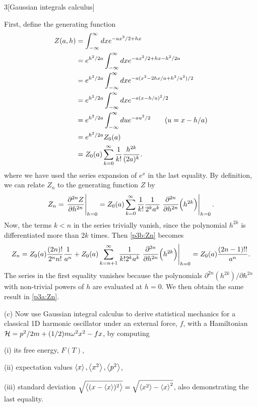 \documentclass[12pt]{article}
\begin{document}
\begin{problem}{3}[Gaussian integrals calculus]
\begin{solution}
First, define the generating function
\begin{align}
    Z(a,h)
    &=\int_{-\infty}^\infty dx e^{-ax^2/2+hx} \notag\\
    &=e^{h^2/2a}\int_{-\infty}^\infty dxe^{-ax^2/2+hx-h^2/2a}\notag\\
    &=e^{h^2/2a}\int_{-\infty}^\infty dxe^{-a(x^2-2hx/a+h^2/a^2)/2}\notag\\
    &=e^{h^2/2a}\int_{-\infty}^\infty dxe^{-a(x-h/a)^2/2}\notag\\
    &=e^{h^2/2a}\int_{-\infty}^\infty due^{-au^2/2}\tag{$u=x-h/a$}\notag\\
    &=e^{h^2/2a}Z_0(a)\notag\\
    &=Z_0(a)\sum_{k=0}^{\infty}\frac1{k!}\frac{h^{2k}}{(2a)^k}.
\end{align}
where we have used the series expansion of $e^{x}$ in the last equality. By
definition, we can relate $Z_n$ to the generating function $Z$ by
\begin{align}\label{p3b:Zn}
    Z_n=\eval{\frac{\partial^{2n} Z}{\partial h^{2n}}}_{h=0}
    =Z_0(a)\sum_{k=0}^\infty
    \frac1{k!}\frac1{2^ka^k}\eval{\frac{\partial^{2n}}{\partial
    h^{2n}}\qty(h^{2k})}_{h=0}.
\end{align}
Now, the terms $k<n$ in the series trivially vanish, since the polynomial
$h^{2k}$ is differentiated more than $2k$ times. Then \eqref{p3b:Zn} becomes
\begin{align}
    Z_n
    =Z_0(a)\frac{(2n)!}{2^nn!}\frac1{a^n}
    +Z_0(a)\sum_{k=n+1}^\infty\frac{1}{k!2^ka^k}\eval{\frac{\partial^{2n}}{\partial
    h^{2n}}\qty(h^{2k})}_{h=0}
    =Z_0(a)\frac{(2n-1)!!}{a^n}.
\end{align}
The series in the first equality vanishes because the polynomials
$\partial^{2n}(h^{2k})/\partial h^{2n}$ with non-trivial powers of $h$ are
evaluated at $h=0$. We then obtain the same result in \eqref{p3a:Zn}.
\end{solution}


(c) Now use Gaussian integral calculus to derive statistical mechanics for a
classical 1D harmonic oscillator under an external force, $f$, with a
Hamiltonian $\mathcal{H}=p^2/2m+(1/2)m\omega^2x^2-fx$, by computing

\qquad(i) its free energy, $F(T)$,

\qquad(ii) expectation values $\expval{x},\expval{x^2},\expval{p^2}$,

\qquad(iii) standard deviation
$\sqrt{\expval{(x-\expval{x})^2}}=\sqrt{\expval{x^2}-\expval{x}^2}$, also
demonstrating the last equality.


\end{problem}
\end{document}
